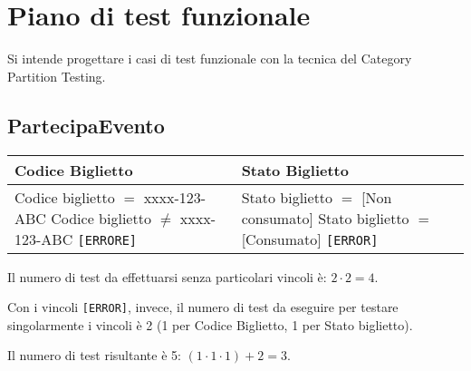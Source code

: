 \chapter{Piano di test funzionale}
Si intende progettare i casi di test funzionale con la tecnica del Category Partition Testing. 

\section{PartecipaEvento}
\begin{table}[H]
	\centering
	\footnotesize
	\renewcommand{\arraystretch}{1.3}
	\begin{tabular}{|p{4cm}|p{4cm}|}
		\hline
		\textbf{Codice Biglietto} & \textbf{Stato Biglietto} \\
		\hline
		Codice biglietto $=$ xxxx-123-ABC \newline
		Codice biglietto $\neq$ xxxx-123-ABC \texttt{[ERRORE]} &

		Stato biglietto $=$ [Non consumato] \newline
		Stato biglietto $=$ [Consumato] \texttt{[ERROR]} \\
		\hline
	\end{tabular}
\end{table}
\noindent Il numero di test da effettuarsi senza particolari vincoli è:
$2 \cdot 2 = 4$.

\noindent Con i vincoli \texttt{[ERROR]}, invece, il numero di test da eseguire per testare singolarmente i vincoli è 2 (1 per Codice Biglietto, 1 per Stato biglietto).

\noindent Il numero di test risultante è 5: $(1 \cdot 1 \cdot 1) + 2 = 3$.

